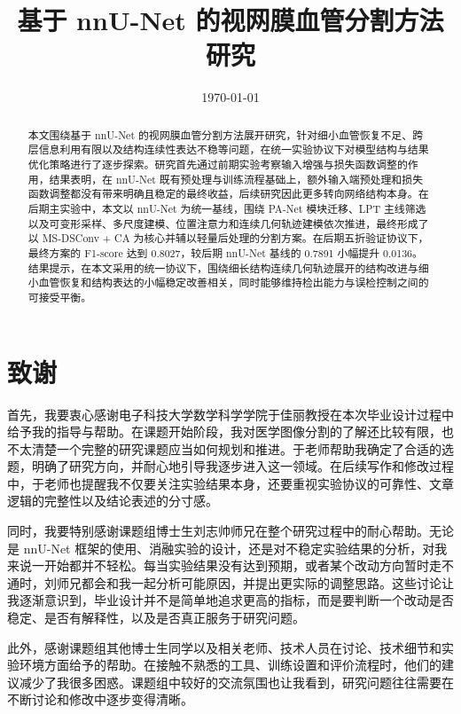 \documentclass[a4paper,12pt]{article}
\begin{document}
\title{基于 nnU-Net 的视网膜血管分割方法研究}
\author{}
\date{\today}

\maketitle

\begin{abstract}
本文围绕基于 nnU-Net 的视网膜血管分割方法展开研究，针对细小血管恢复不足、跨层信息利用有限以及结构连续性表达不稳等问题，在统一实验协议下对模型结构与结果优化策略进行了逐步探索。研究首先通过前期实验考察输入增强与损失函数调整的作用，结果表明，在 nnU-Net 既有预处理与训练流程基础上，额外输入端预处理和损失函数调整都没有带来明确且稳定的最终收益，后续研究因此更多转向网络结构本身。在后期主实验中，本文以 nnU-Net 为统一基线，围绕 PA-Net 模块迁移、LPT 主线筛选以及可变形采样、多尺度建模、位置注意力和连续几何轨迹建模依次推进，最终形成了以 MS-DSConv + CA 为核心并辅以轻量后处理的分割方案。在后期五折验证协议下，最终方案的 F1-score 达到 0.8027，较后期 nnU-Net 基线的 0.7891 小幅提升 0.0136。结果提示，在本文采用的统一协议下，围绕细长结构连续几何轨迹展开的结构改进与细小血管恢复和结构表达的小幅稳定改善相关，同时能够维持检出能力与误检控制之间的可接受平衡。
\end{abstract}

\section*{致谢}
首先，我要衷心感谢电子科技大学数学科学学院于佳丽教授在本次毕业设计过程中给予我的指导与帮助。在课题开始阶段，我对医学图像分割的了解还比较有限，也不太清楚一个完整的研究课题应当如何规划和推进。于老师帮助我确定了合适的选题，明确了研究方向，并耐心地引导我逐步进入这一领域。在后续写作和修改过程中，于老师也提醒我不仅要关注实验结果本身，还要重视实验协议的可靠性、文章逻辑的完整性以及结论表述的分寸感。

同时，我要特别感谢课题组博士生刘志帅师兄在整个研究过程中的耐心帮助。无论是 nnU-Net 框架的使用、消融实验的设计，还是对不稳定实验结果的分析，对我来说一开始都并不轻松。每当实验结果没有达到预期，或者某个改动方向暂时走不通时，刘师兄都会和我一起分析可能原因，并提出更实际的调整思路。这些讨论让我逐渐意识到，毕业设计并不是简单地追求更高的指标，而是要判断一个改动是否稳定、是否有解释性，以及是否真正服务于研究问题。

此外，感谢课题组其他博士生同学以及相关老师、技术人员在讨论、技术细节和实验环境方面给予的帮助。在接触不熟悉的工具、训练设置和评价流程时，他们的建议减少了我很多困惑。课题组中较好的交流氛围也让我看到，研究问题往往需要在不断讨论和修改中逐步变得清晰。
\end{document}
